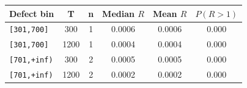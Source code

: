 \begin{tabular}{lccccc}
\toprule
Defect bin & T & n & Median $R$ & Mean $R$ & $P(R>1)$ \\
\midrule
\texttt{[301,700]} & 300 & 1 & 0.0006 & 0.0006 & 0.000 \\
\texttt{[301,700]} & 1200 & 1 & 0.0004 & 0.0004 & 0.000 \\
\texttt{[701,+inf)} & 300 & 2 & 0.0005 & 0.0005 & 0.000 \\
\texttt{[701,+inf)} & 1200 & 2 & 0.0002 & 0.0002 & 0.000 \\
\bottomrule
\end{tabular}
